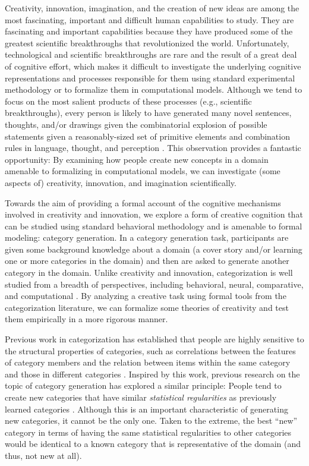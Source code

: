 \documentclass[12pt]{article}
\begin{document}
\begin{flushleft}
Creativity, innovation, imagination, and the creation of new ideas are among the most fascinating, important and difficult human capabilities to study. They are fascinating and important capabilities because they have produced some of the greatest scientific breakthroughs that revolutionized the world. Unfortunately, technological and scientific breakthroughs are rare and the result of a great deal of cognitive effort, which makes it difficult to investigate the underlying cognitive representations and processes responsible for them using standard experimental methodology or to formalize them in computational models. Although we tend to focus on the most salient products of these processes (e.g., scientific breakthroughs), every person is likely to have generated many novel sentences, thoughts, and/or drawings given the combinatorial explosion of possible statements given a reasonably-sized set of primitive elements and combination rules in language, thought, and perception \citep{goldstone2003}. This observation provides a fantastic opportunity: By examining how people create new concepts in a domain amenable to formalizing in computational models, we can investigate (some aspects of) creativity, innovation, and imagination scientifically.

Towards the aim of providing a formal account of the cognitive mechanisms involved in creativity and innovation, we explore a form of creative cognition that can be studied using standard behavioral methodology and is amenable to formal modeling: category generation. In a category generation task, participants are given some background knowledge about a domain (a cover story and/or learning one or more categories in the domain) and then are asked to generate another category in the domain. Unlike creativity and innovation, categorization is well studied from a breadth of perspectives, including behavioral, neural, comparative, and computational  \citep{kurtz2015human,mack2013,margolis2015,pothoswills2011}. By analyzing a creative task using formal tools from the categorization literature, we can formalize some theories of creativity and test them empirically in a more rigorous manner. 

Previous work in categorization has established that people are highly sensitive to the structural properties of categories, such as correlations between the features of category members and the relation between items within the same category and those in different categories \citep{roschmervis1975,regier2007,shepard1961learning}. Inspired by this work, previous research on the topic of category generation has explored a similar principle: People tend to create new categories that have similar {\em statistical regularities} as previously learned categories \citep{jern2013probabilistic,ward1994structured}. Although this is an important characteristic of generating new categories, it cannot be the only one. Taken to the extreme, the best ``new'' category in terms of having the same statistical regularities to other categories would be identical to a known category that is representative of the domain (and thus, not new at all). 


\end{flushleft}
\end{document}
